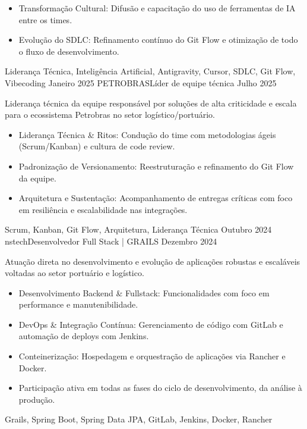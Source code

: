 \begin{experiences}
{\begin{itemize}
               \item Transformação Cultural: Difusão e capacitação do uso de ferramentas de IA entre os times.
               \item Evolução do SDLC: Refinamento contínuo do Git Flow e otimização de todo o fluxo de desenvolvimento.
              \end{itemize}
            }
            {Liderança Técnica, Inteligência Artificial, Antigravity, Cursor, SDLC, Git Flow, Vibecoding}
    \emptySeparator
    \experience
        {Janeiro 2025} {PETROBRAS}{Líder de equipe técnica}{}
        {Julho 2025} { Liderança técnica da equipe responsável por soluções de alta criticidade e escala para o ecossistema Petrobras no setor logístico/portuário.
            \begin{itemize}
               \item Liderança Técnica \& Ritos: Condução do time com metodologias ágeis (Scrum/Kanban) e cultura de code review.
               \item Padronização de Versionamento: Reestruturação e refinamento do Git Flow da equipe.
               \item Arquitetura e Sustentação: Acompanhamento de entregas críticas com foco em resiliência e escalabilidade nas integrações.
              \end{itemize}
            }
            {Scrum, Kanban, Git Flow, Arquitetura, Liderança Técnica}
    \emptySeparator
    \experience
        {Outubro 2024} {nstech}{Desenvolvedor Full Stack | GRAILS}{}
        {Dezembro 2024} { Atuação direta no desenvolvimento e evolução de aplicações robustas e escaláveis voltadas ao setor portuário e logístico.
            \begin{itemize}
               \item Desenvolvimento Backend \& Fullstack: Funcionalidades com foco em performance e manutenibilidade.
               \item DevOps \& Integração Contínua: Gerenciamento de código com GitLab e automação de deploys com Jenkins.
               \item Conteinerização: Hospedagem e orquestração de aplicações via Rancher e Docker.
               \item Participação ativa em todas as fases do ciclo de desenvolvimento, da análise à produção.
              \end{itemize}
            }
            {Grails, Spring Boot, Spring Data JPA, GitLab, Jenkins, Docker, Rancher}
    \emptySeparator
    \experience

\end{experiences}
